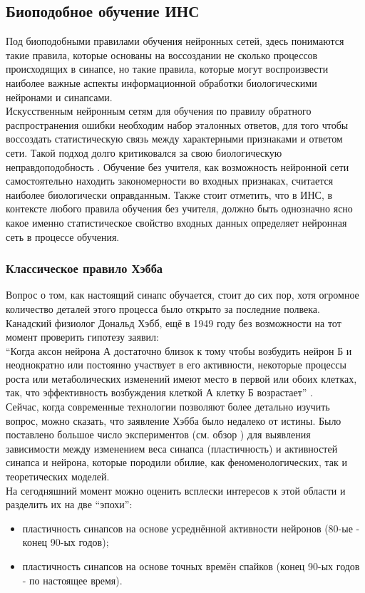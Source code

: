 \documentclass[a4paper,10pt]{article}
\begin{document}
\subsection{Биоподобное обучение ИНС}
\indent Под биоподобными правилами обучения нейронных сетей, здесь понимаются такие правила, которые основаны на воссоздании не сколько процессов происходящих в синапсе, но такие правила, которые могут воспроизвести наиболее важные аспекты информационной обработки биологическими нейронами и синапсами.\\
\indent Искусственным нейронным сетям для обучения по правилу обратного распространения ошибки необходим набор эталонных ответов, для того чтобы воссоздать статистическую связь между характерными признаками и ответом сети. Такой подход долго критиковался за свою биологическую неправдоподобность \cite{Uossermen}. Обучение без учителя, как возможность нейронной сети самостоятельно находить закономерности во входных признаках, считается наиболее биологически оправданным. Также стоит отметить, что в ИНС, в контексте любого правила обучения без учителя, должно быть однозначно ясно какое именно статистическое свойство входных данных определяет нейронная сеть в процессе обучения.\\

\subsubsection{Классическое правило Хэбба}\label{sec:hebb}
\indent Вопрос о том, как настоящий синапс обучается, стоит до сих пор, хотя огромное количество деталей этого процесса было открыто за последние полвека. Канадский физиолог Дональд Хэбб, ещё в 1949 году без возможности на тот момент проверить гипотезу заявил:\\
\indent ``Когда аксон нейрона А достаточно близок к тому чтобы возбудить нейрон Б и неоднократно или постоянно участвует в его активности, некоторые процессы роста или метаболических изменений имеют место в первой или обоих клетках, так, что эффективность возбуждения клеткой А клетку Б возрастает'' \cite{Hebb1949}.\\
\indent Сейчас, когда современные технологии позволяют более детально изучить вопрос, можно сказать, что заявление Хэбба было недалеко от истины. Было поставлено большое число экспериментов (см. обзор \cite{BiPoo}) для выявления зависимости между изменением веса синапса (пластичность) и активностей синапса и нейрона, которые породили обилие, как феноменологических, так и теоретических моделей.\\
\indent На сегодняшний момент можно оценить всплески интересов к этой области и разделить их на две ``эпохи'':
\begin{itemize}
\item пластичность синапсов на основе усреднённой активности нейронов (80-ые - конец 90-ых годов);
\item пластичность синапсов на основе точных времён спайков (конец 90-ых годов - по настоящее время).
\end{itemize}
\end{document}
